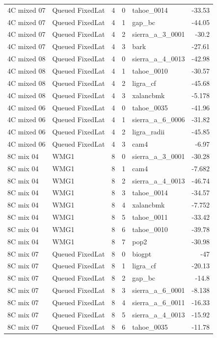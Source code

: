 \begin{tabular}{llrrlr}
4C mixed 07 & Queued FixedLat & 4 & 0 & tahoe\_0014 & -33.53 \\
4C mixed 07 & Queued FixedLat & 4 & 1 & gap\_bc & -44.05 \\
4C mixed 07 & Queued FixedLat & 4 & 2 & sierra\_a\_3\_0001 & -30.2 \\
4C mixed 07 & Queued FixedLat & 4 & 3 & bark & -27.61 \\
4C mixed 08 & Queued FixedLat & 4 & 0 & sierra\_a\_4\_0013 & -42.98 \\
4C mixed 08 & Queued FixedLat & 4 & 1 & tahoe\_0010 & -30.57 \\
4C mixed 08 & Queued FixedLat & 4 & 2 & ligra\_cf & -45.68 \\
4C mixed 08 & Queued FixedLat & 4 & 3 & xalancbmk & -5.178 \\
4C mixed 06 & Queued FixedLat & 4 & 0 & tahoe\_0035 & -41.96 \\
4C mixed 06 & Queued FixedLat & 4 & 1 & sierra\_a\_6\_0006 & -31.82 \\
4C mixed 06 & Queued FixedLat & 4 & 2 & ligra\_radii & -45.85 \\
4C mixed 06 & Queued FixedLat & 4 & 3 & cam4 & -6.97 \\
8C mix 04 & WMG1 & 8 & 0 & sierra\_a\_3\_0001 & -30.28 \\
8C mix 04 & WMG1 & 8 & 1 & cam4 & -7.682 \\
8C mix 04 & WMG1 & 8 & 2 & sierra\_a\_4\_0013 & -46.74 \\
8C mix 04 & WMG1 & 8 & 3 & tahoe\_0014 & -34.57 \\
8C mix 04 & WMG1 & 8 & 4 & xalancbmk & -7.752 \\
8C mix 04 & WMG1 & 8 & 5 & tahoe\_0011 & -33.42 \\
8C mix 04 & WMG1 & 8 & 6 & tahoe\_0010 & -39.78 \\
8C mix 04 & WMG1 & 8 & 7 & pop2 & -30.98 \\
8C mix 07 & Queued FixedLat & 8 & 0 & biogpt & -47 \\
8C mix 07 & Queued FixedLat & 8 & 1 & ligra\_cf & -20.13 \\
8C mix 07 & Queued FixedLat & 8 & 2 & gap\_bc & -14.8 \\
8C mix 07 & Queued FixedLat & 8 & 3 & sierra\_a\_6\_0001 & -8.138 \\
8C mix 07 & Queued FixedLat & 8 & 4 & sierra\_a\_6\_0011 & -16.33 \\
8C mix 07 & Queued FixedLat & 8 & 5 & sierra\_a\_4\_0013 & -15.92 \\
8C mix 07 & Queued FixedLat & 8 & 6 & tahoe\_0035 & -11.78 \\

\end{tabular}
